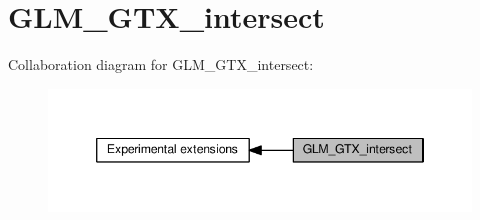 \hypertarget{group__gtx__intersect}{}\section{G\+L\+M\+\_\+\+G\+T\+X\+\_\+intersect}
\label{group__gtx__intersect}
Collaboration diagram for G\+L\+M\+\_\+\+G\+T\+X\+\_\+intersect\+:
\nopagebreak
\begin{figure}[H]
\begin{center}
\leavevmode
\includegraphics[width=346pt]{df/d2a/group__gtx__intersect}
\end{center}
\end{figure}
